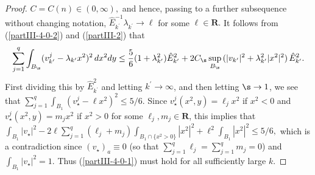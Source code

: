 \documentclass[a4paper,11pt]{amsart}
\begin{document}
\begin{proof}
$C = C(n) \in (0, \infty),$ and hence, passing to a further subsequence without changing notation, ${\hat E}_{k^{\prime}}^{-1}\lambda_{k^{\prime}} \to \ell$ for some $\ell \in {\mathbf R}.$ It follows from (\ref{partIII-4-0-2}) and (\ref{partIII-2}) that 
$$\sum_{j=1}^{q}\int_{B_{\s}}(v_{k^{\prime}}^{j} - \lambda_{k^{\prime}} x^{2})^{2} \,dx^{2}dy\leq \frac{5}{6}(1 + \lambda_{k^{\prime}}^{2}){\hat E}_{k^{\prime}}^{2} + 2C_{\s}\sup_{B_{\s}} \, (|v_{k^{\prime}}|^{2} + \lambda_{k^{\prime}}^{2}|x^{2}|^{2}) \, {\hat E}_{k^{\prime}}^{2}.$$
First dividing this by ${\hat E}_{k^{\prime}}^{2}$ and letting $k^{\prime} \to \infty$, and then letting $\s \to 1$, we see that $\sum_{j=1}^{q}\int_{B_{1}}(v_{\star}^{j} - \ell x^{2})^{2} \leq 5/6.$ Since $v_{\star}^{j}(x^{2}, y) = \ell_{j}x^{2}$ if 
$x^{2} < 0$ and $v_{\star}^{j}(x^{2}, y) = m_{j} x^{2}$ if $x^{2} > 0$ for some $\ell_{j}, m_{j} \in {\mathbf R}$, 
this implies that $\int_{B_{1}}|v_{\star}|^{2} - 2\ell\sum_{j=1}^{q} (\ell_{j} + m_{j}) \int_{B_{1} \cap \{x^{2} > 0\}} |x^{2}|^{2} + \ell^{2} \int_{B_{1}}|x^{2}|^{2} \leq 5/6,$ which is a contradiction since $(v_{\star})_{a} \equiv 0$  (so that $\sum_{j=1}^{q} \ell_{j} = \sum_{j=1}^{q} m_{j} = 0$) and $\int_{B_{1}} |v_{\star}|^{2} =1.$ Thus (\ref{partIII-4-0-1}) must hold for all sufficiently large $k$. 
 



\end{proof}
\end{document}
